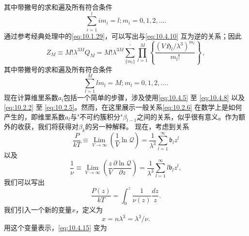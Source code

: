 其中带撇号的求和遍及所有符合条件
\begin{equation}\tag{10.4.10}\label{eq:10.4.10}
\sum _ { i = 1 } ^{l} i m _ { i } = l ;  m _ { i } = 0 , 1 , 2 , . . . .
\end{equation}
通过参考经典处理中的\autoref{eq:10.1.29}，可以写出与\autoref{eq:10.4.10} 互为逆的关系；因此
\begin{equation}\tag{10.4.11}\label{eq:10.4.11}
Z _ { M } \equiv M ! \lambda ^{3 M} Q _ { M } = M ! \lambda ^{3 M} \sum _ { \{ m _ { l } \} } ^{\prime} \prod _ { l = 1 } ^{M} \left\{ \frac { ( V \, \mathfrak { H } _ { l } / \lambda ^{3} ) ^{m _ { l} } } { m _ { l } ! } \right\} \, ,
\end{equation}
其中带撇号的求和遍及所有符合条件
\begin{equation}\tag{10.4.12}\label{eq:10.4.12}
\sum _ { l = 1 } ^{M} l m _ { l } = M ;  m _ { l } = 0 , 1 , 2 , \ldots .
\end{equation}
现在计算维里系数\(a_{l}\)包括一个简单的步骤，涉及使用\autoref{eq:10.4.5} 至 \autoref{eq:10.4.8} 以及 \autoref{eq:10.2.2} 至 \autoref{eq:10.2.5}。然而，在这里展示一般关系\autoref{eq:10.2.6} 在数学上是如何产生的，即维里系数\(a_{l}\)与"不可约簇积分"\(\beta_{l-1}\)之间的关系，似乎很有意义。作为额外的收获，我们将获得对\(\beta_{k}\)的另一种解释。
现在，考虑到关系
\begin{equation}\tag{10.4.13}\label{eq:10.4.13}
\frac { P } { k T } \equiv \operatorname* { L i m } _ { V \to \infty } \left( \frac { 1 } { V } \ln \mathcal { Q } \right) = \frac { 1 } { \lambda ^{3} } \sum _ { l = 1 } ^{\infty} \mathfrak { b } _ { l } z ^{l}
\end{equation}
以及
\begin{equation}\tag{10.4.14}\label{eq:10.4.14}
\frac { 1 } { \nu } \equiv \operatorname* { L i m } _ { V \to \infty } \left( \frac { z } { V } \frac { \partial \ln \mathcal { Q } } { \partial z } \right) = \frac { 1 } { \lambda ^{3} } \sum _ { l = 1 } ^{\infty} l \mathfrak { b } _ { l } z ^{l} ,
\end{equation}
我们可以写出
\begin{equation}\tag{10.4.15}\label{eq:10.4.15}
{ \frac { P ( z ) } { k T } } = \int _ { 0 } ^{z} { \frac { 1 } { \nu ( z ) } } { \frac { d z } { z } } .
\end{equation}
我们引入一个新的变量\(x\)，定义为
\begin{equation}\tag{10.4.16}\label{eq:10.4.16}
x = n \lambda ^{3} = \lambda ^{3} / \nu .
\end{equation}
用这个变量表示，\autoref{eq:10.4.15} 变为
